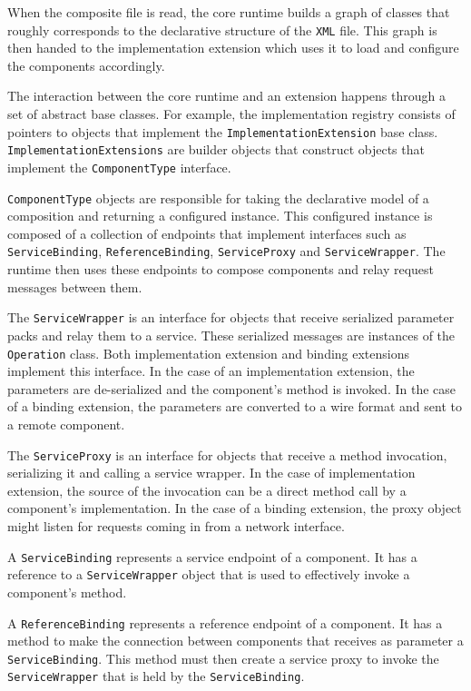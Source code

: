 
When the composite file is read, the core runtime builds a graph of classes that roughly corresponds to the
declarative structure of the \texttt{XML} file. This graph is then handed to the implementation extension which uses it
to load and configure the components accordingly.

The interaction between the core runtime and an extension happens through a set of abstract base classes. For example, the
implementation registry consists of pointers to objects that implement the \texttt{ImplementationExtension} base class.
\texttt{ImplementationExtensions} are builder objects that construct objects that implement the \texttt{ComponentType}
interface.

\texttt{ComponentType} objects are responsible for taking the declarative model of a composition and returning a configured
instance. This configured instance is composed of a collection of endpoints that implement interfaces such as
\texttt{ServiceBinding}, \texttt{ReferenceBinding}, \texttt{ServiceProxy} and \texttt{ServiceWrapper}. The
runtime then uses these endpoints to compose components and relay request messages between them.

The \texttt{ServiceWrapper} is an interface for objects that receive serialized parameter packs and relay them to a service.
These serialized messages are instances of the \texttt{Operation} class. Both implementation extension and binding extensions
implement this interface. In the case of an implementation extension, the parameters are de-serialized and the component's
method is invoked. In the case of a binding extension, the parameters are converted to a wire format and sent to a remote component. 

The \texttt{ServiceProxy} is an interface for objects that receive a method invocation, serializing it and
calling a service wrapper. In the case of implementation extension, the source of the invocation can be a direct method
call by a component's implementation. In the case of a binding extension, the proxy object might listen for requests coming
in from a network interface.

A \texttt{ServiceBinding} represents a service endpoint of a component. It has a reference to a \texttt{ServiceWrapper}
object that is used to effectively invoke a component's method.

A \texttt{ReferenceBinding} represents a reference endpoint of a component. It has a method to make the connection
between components that receives as parameter a \texttt{ServiceBinding}. This method must then create a service proxy
to invoke the \texttt{ServiceWrapper} that is held by the \texttt{ServiceBinding}.

